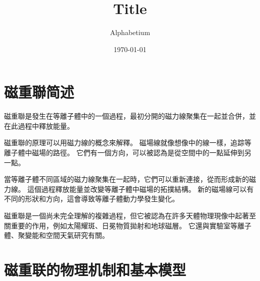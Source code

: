 \documentclass[12pt, a4paper, oneside]{article}
\title{Title}
\date{\today}
\author{Alphabetium}
\begin{document}
\begin{spacing}{2.0}
\maketitle


\section{磁重聯简述}

磁重聯是發生在等離子體中的一個過程，最初分開的磁力線聚集在一起並合併，並在此過程中釋放能量。

磁重聯的原理可以用磁力線的概念來解釋。 磁場線就像想像中的線一樣，追踪等離子體中磁場的路徑。 它們有一個方向，可以被認為是從空間中的一點延伸到另一點。

當等離子體不同區域的磁力線聚集在一起時，它們可以重新連接，從而形成新的磁力線。 這個過程釋放能量並改變等離子體中磁場的拓撲結構。 
新的磁場線可以有不同的形狀和方向，這會導致等離子體動力學發生變化。

磁重聯是一個尚未完全理解的複雜過程，但它被認為在許多天體物理現像中起著至關重要的作用，例如太陽耀斑、日冕物質拋射和地球磁層。 
它還與實驗室等離子體、聚變能和空間天氣研究有關。
\section{磁重联的物理机制和基本模型}

\end{spacing}
\end{document}

